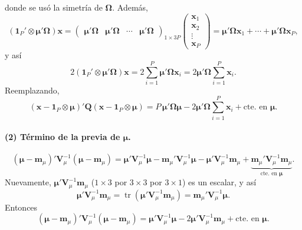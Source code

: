 \documentclass[11pt,a4paper]{article}
\begin{document}
donde se usó la simetría de $\mathbf{\Omega}$. Además,
\[
\left(\boldsymbol{1}_P' \otimes \boldsymbol{\mu}'\mathbf{\Omega}\right)\boldsymbol{x}
= \begin{pmatrix} \boldsymbol{\mu}'\mathbf{\Omega} & \boldsymbol{\mu}'\mathbf{\Omega} & \cdots & \boldsymbol{\mu}'\mathbf{\Omega} \end{pmatrix}_{1\times 3P}
\begin{pmatrix} \boldsymbol{x}_1 \\ \boldsymbol{x}_2 \\ \vdots \\ \boldsymbol{x}_P \end{pmatrix}
= \boldsymbol{\mu}'\mathbf{\Omega}\boldsymbol{x}_1 + \cdots + \boldsymbol{\mu}'\mathbf{\Omega}\boldsymbol{x}_P,
\]
y así
\[
2\left(\boldsymbol{1}_P' \otimes \boldsymbol{\mu}'\mathbf{\Omega}\right)\boldsymbol{x} = 2\sum_{i=1}^{P}\boldsymbol{\mu}'\mathbf{\Omega}\boldsymbol{x}_i = 2\boldsymbol{\mu}'\mathbf{\Omega}\sum_{i=1}^{P}\boldsymbol{x}_i.
\]
Reemplazando,
\[
(\boldsymbol{x} - \boldsymbol{1}_P \otimes \boldsymbol{\mu})' \mathbf{Q} (\boldsymbol{x} - \boldsymbol{1}_P \otimes \boldsymbol{\mu})
= P\,\boldsymbol{\mu}'\mathbf{\Omega}\boldsymbol{\mu} - 2\boldsymbol{\mu}'\mathbf{\Omega}\sum_{i=1}^{P}\boldsymbol{x}_i + \text{cte. en }\boldsymbol{\mu}.
\]

\paragraph{(2) Término de la previa de $\boldsymbol{\mu}$.}
\[
(\boldsymbol{\mu} - \boldsymbol{m}_\mu)' \mathbf{V}_\mu^{-1} (\boldsymbol{\mu} - \boldsymbol{m}_\mu)
= \boldsymbol{\mu}'\mathbf{V}_\mu^{-1}\boldsymbol{\mu} - \boldsymbol{m}_\mu'\mathbf{V}_\mu^{-1}\boldsymbol{\mu} - \boldsymbol{\mu}'\mathbf{V}_\mu^{-1}\boldsymbol{m}_\mu + \underbrace{\boldsymbol{m}_\mu'\mathbf{V}_\mu^{-1}\boldsymbol{m}_\mu}_{\text{cte. en }\boldsymbol{\mu}}.
\]
Nuevamente, $\boldsymbol{\mu}'\mathbf{V}_\mu^{-1}\boldsymbol{m}_\mu$ ($1\times3$ por $3\times3$ por $3\times1$) es un escalar, y así
\[
\boldsymbol{\mu}'\mathbf{V}_\mu^{-1}\boldsymbol{m}_\mu = \operatorname{tr}\left(\boldsymbol{\mu}'\mathbf{V}_\mu^{-1}\boldsymbol{m}_\mu\right) = \boldsymbol{m}_\mu'\mathbf{V}_\mu^{-1}\boldsymbol{\mu}.
\]
Entonces
\[
(\boldsymbol{\mu} - \boldsymbol{m}_\mu)' \mathbf{V}_\mu^{-1} (\boldsymbol{\mu} - \boldsymbol{m}_\mu) = \boldsymbol{\mu}'\mathbf{V}_\mu^{-1}\boldsymbol{\mu} - 2\boldsymbol{\mu}'\mathbf{V}_\mu^{-1}\boldsymbol{m}_\mu + \text{cte. en }\boldsymbol{\mu}.
\]
\end{document}
